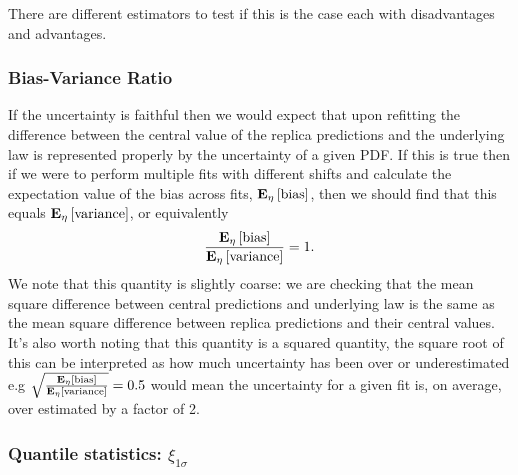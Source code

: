 There are different estimators to test if this
is the case each with disadvantages and advantages.

\subsubsection{Bias-Variance Ratio}

If the uncertainty is faithful then we would expect that upon refitting the
difference between the central value of the replica predictions and the underlying
law is represented properly by the uncertainty of a given PDF. If this is true
then if we were to perform multiple fits with different shifts and calculate the
expectation value of the bias across fits, $\mathbf{E}_{\eta}\left[ {\rm bias} \right]$, then we should find
that this equals $\mathbf{E}_{\eta}\left[ {\rm variance} \right]$, or equivalently
\begin{equation}
    \frac{\mathbf{E}_{\eta}\left[ {\rm bias} \right]}{\mathbf{E}_{\eta}\left[ {\rm variance} \right]} = 1.
\end{equation}
We note that this quantity is slightly coarse: we are checking that the mean square
difference between central predictions and underlying law is the same as the
mean square difference between replica predictions and their central values.
It's also worth noting that this quantity is a squared quantity, the square
root of this can be interpreted as how much uncertainty has been over or
underestimated e.g $\sqrt{\frac{\mathbf{E}_{\eta}\left[ {\rm bias} \right]}{\mathbf{E}_{\eta}\left[ {\rm variance} \right]}} = 0.5$ would
mean the uncertainty for a given fit is, on average, over estimated by a factor
of 2.

\subsubsection{Quantile statistics: $\xi_{1\sigma}$}

